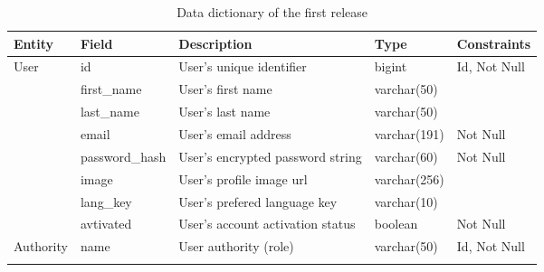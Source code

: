 \begin{landscape}
    \begin{table}
        \caption{Data dictionary of the first release}
        \label{tab-r1dd}
        \begin{tabular}{ | m{} | m{} | m{} | m{} | m{} | }
            \hline
            \textbf{Entity}            & \textbf{Field} & \textbf{Description}             & \textbf{Type} & \textbf{Constraints} \\
            \hline
            \multirow[t]{3}{5em}{User} & id             & User's unique identifier         & bigint        & Id, Not Null         \\
            \cline{2-5}
                                       & first\_name    & User's first name                & varchar(50)   &                      \\
            \cline{2-5}
                                       & last\_name     & User's last name                 & varchar(50)   &                      \\
            \cline{2-5}
                                       & email          & User's email address             & varchar(191)  & Not Null             \\
            \cline{2-5}
                                       & password\_hash & User's encrypted password string & varchar(60)   & Not Null             \\
            \cline{2-5}
                                       & image          & User's profile image url         & varchar(256)  &                      \\
            \cline{2-5}
                                       & lang\_key      & User's prefered language key     & varchar(10)   &                      \\
            \cline{2-5}
                                       & avtivated      & User's account activation status & boolean       & Not Null             \\
            \hline
            Authority                  & name           & User authority (role)            & varchar(50)   & Id, Not Null         \\
            \hline                                                                                                                \\
        \end{tabular}
    \end{table}
\end{landscape}


